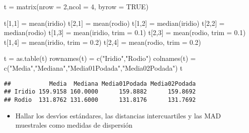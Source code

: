 \documentclass[
]{article}
\newenvironment{Shaded}{\begin{snugshade}}{\end{snugshade}}
\newcommand{\AttributeTok}[1]{\textcolor[rgb]{0.77,0.63,0.00}{#1}}
\newcommand{\ConstantTok}[1]{\textcolor[rgb]{0.00,0.00,0.00}{#1}}
\newcommand{\DecValTok}[1]{\textcolor[rgb]{0.00,0.00,0.81}{#1}}
\newcommand{\FloatTok}[1]{\textcolor[rgb]{0.00,0.00,0.81}{#1}}
\newcommand{\FunctionTok}[1]{\textcolor[rgb]{0.00,0.00,0.00}{#1}}
\newcommand{\NormalTok}[1]{#1}
\newcommand{\OtherTok}[1]{\textcolor[rgb]{0.56,0.35,0.01}{#1}}
\newcommand{\StringTok}[1]{\textcolor[rgb]{0.31,0.60,0.02}{#1}}
\providecommand{\tightlist}{%
  \setlength{\itemsep}{0pt}\setlength{\parskip}{0pt}}
\begin{document}
\begin{Shaded}
\begin{Highlighting}[]
\NormalTok{t }\OtherTok{=} \FunctionTok{matrix}\NormalTok{(}\AttributeTok{nrow =} \DecValTok{2}\NormalTok{,}\AttributeTok{ncol =} \DecValTok{4}\NormalTok{, }\AttributeTok{byrow =} \ConstantTok{TRUE}\NormalTok{)}

\NormalTok{t[}\DecValTok{1}\NormalTok{,}\DecValTok{1}\NormalTok{] }\OtherTok{=} \FunctionTok{mean}\NormalTok{(iridio)}
\NormalTok{t[}\DecValTok{2}\NormalTok{,}\DecValTok{1}\NormalTok{] }\OtherTok{=} \FunctionTok{mean}\NormalTok{(rodio)}
\NormalTok{t[}\DecValTok{1}\NormalTok{,}\DecValTok{2}\NormalTok{] }\OtherTok{=} \FunctionTok{median}\NormalTok{(iridio)}
\NormalTok{t[}\DecValTok{2}\NormalTok{,}\DecValTok{2}\NormalTok{] }\OtherTok{=} \FunctionTok{median}\NormalTok{(rodio)}
\NormalTok{t[}\DecValTok{1}\NormalTok{,}\DecValTok{3}\NormalTok{] }\OtherTok{=} \FunctionTok{mean}\NormalTok{(iridio, }\AttributeTok{trim =} \FloatTok{0.1}\NormalTok{)}
\NormalTok{t[}\DecValTok{2}\NormalTok{,}\DecValTok{3}\NormalTok{] }\OtherTok{=} \FunctionTok{mean}\NormalTok{(rodio, }\AttributeTok{trim =} \FloatTok{0.1}\NormalTok{)}
\NormalTok{t[}\DecValTok{1}\NormalTok{,}\DecValTok{4}\NormalTok{] }\OtherTok{=} \FunctionTok{mean}\NormalTok{(iridio, }\AttributeTok{trim =} \FloatTok{0.2}\NormalTok{)}
\NormalTok{t[}\DecValTok{2}\NormalTok{,}\DecValTok{4}\NormalTok{] }\OtherTok{=} \FunctionTok{mean}\NormalTok{(rodio, }\AttributeTok{trim =} \FloatTok{0.2}\NormalTok{)}

\NormalTok{t }\OtherTok{=} \FunctionTok{as.table}\NormalTok{(t)}
\FunctionTok{rownames}\NormalTok{(t) }\OtherTok{=} \FunctionTok{c}\NormalTok{(}\StringTok{"Iridio"}\NormalTok{,}\StringTok{"Rodio"}\NormalTok{)}
\FunctionTok{colnames}\NormalTok{(t) }\OtherTok{=} \FunctionTok{c}\NormalTok{(}\StringTok{"Media"}\NormalTok{,}\StringTok{"Mediana"}\NormalTok{,}\StringTok{"Media01Podada"}\NormalTok{,}\StringTok{"Media02Podada"}\NormalTok{)}
\NormalTok{t}
\end{Highlighting}
\end{Shaded}

\begin{verbatim}
##           Media  Mediana Media01Podada Media02Podada
## Iridio 159.9158 160.0000      159.8882      159.8692
## Rodio  131.8762 131.6000      131.8176      131.7692
\end{verbatim}

\begin{itemize}
\tightlist
\item
  Hallar los desvı́os estándares, las distancias intercuartiles y las MAD
  muestrales como medidas de dispersión
\end{itemize}
\end{document}
